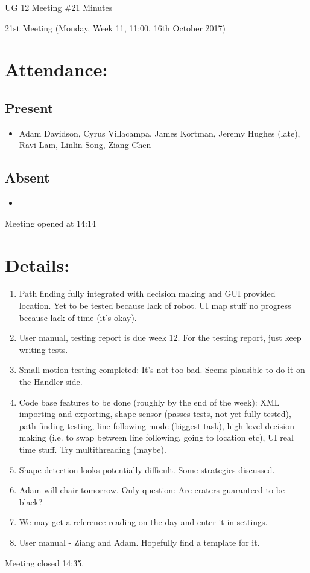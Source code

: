 \documentclass{article}
\begin{document}
\begin{adjustwidth}{2.5em}{0pt}
\begin{center}
\Large{UG 12 Meeting \#21 Minutes}\\
\end{center}
\end{adjustwidth}

21st Meeting (Monday, Week 11, 11:00, 16th October 2017)
\section{Attendance:}
\subsection*{Present}
\begin{itemize}
\item Adam Davidson, Cyrus Villacampa, James Kortman, Jeremy Hughes (late), Ravi Lam, Linlin Song, Ziang Chen
\end{itemize}
\subsection*{Absent}
\begin{itemize}
\item 
\end {itemize}

Meeting opened at 14:14
\section{Details:}
\begin{enumerate}
\item Path finding fully integrated with decision making and GUI provided location. Yet to be tested because lack of robot. UI map stuff no progress because lack of time (it’s okay). 
\item User manual, testing report is due week 12. For the testing report, just keep writing tests.
\item Small motion testing completed: It's not too bad. Seems plausible to do it on the Handler side. 
\item Code base features to be done (roughly by the end of the week): XML importing and exporting, shape sensor (passes tests, not yet fully tested), path finding testing, line following mode (biggest task), high level decision making (i.e. to swap between line following, going to location etc), UI real time stuff. Try multithreading (maybe).
\item Shape detection looks potentially difficult. Some strategies discussed. 
\item Adam will chair tomorrow. Only question: Are craters guaranteed to be black?
\item We may get a reference reading on the day and enter it in settings.
\item User manual - Ziang and Adam. Hopefully find a template for it.
\end{enumerate}
Meeting closed 14:35.
\end{document}
